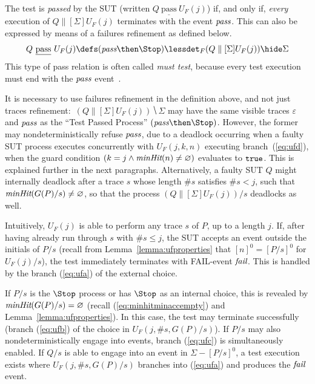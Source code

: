 \documentclass[3p,times]{elsarticle}
\newcommand{\ist}{\mbox{{\tt true}}}
\newcommand{\epass}{{\text{\it pass}}}
\newcommand{\efail}{{\text{\it fail}}}
\newcommand{\pass}{\underline{\text{pass}}}
\newcommand{\minhits}{\text{\it minHit}}
\begin{document}
The test is \emph{passed} by the SUT (written $Q\ \pass\ U_F(j)$) if, and
only if, {\it every} execution of $Q\parallel[\Sigma] U_F(j)$ terminates with
the event $\epass$. This can also be  expressed by means of a failures
refinement as defined below.
%
\begin{equation}
\label{eq:passF}
Q\ \pass\ U_F(j) \defs (\epass\then\Stop) \lessdet_F (Q\parallel[\Sigma] U_F(j)) \hide \Sigma
\end{equation}
%
This type of pass relation is often called \emph{must test}, because every
test execution must end with the $\epass$
event~\cite{Hennessy:1988:ATP:50497}.

It is necessary to use failures refinement in the definition above, and not
just traces refinement:~$(Q\parallel[\Sigma] U_F(j)) \hide \Sigma$ may have
the same visible traces $\varepsilon$ and $\epass$ as the ``Test Passed
Process'' $(\epass\then\Stop)$. However, the former may nondeterministically
refuse $\epass$, due to a deadlock occurring when a faulty SUT process
executes concurrently with $U_F(j,k,n)$ executing branch~(\ref{eq:ufd}), when
the guard condition $(k = j\wedge \minhits(n)\neq\varnothing)$ evaluates to
$\ist$. This is explained further in the next paragraphs. Alternatively, a
faulty SUT $Q$ might internally deadlock after a trace $s$ whose length $\#s$ 
satisfies  $\#s < j$, such that
  $\minhits(G(P)/s) \neq \varnothing$, so that the process
$(Q\parallel[\Sigma] U_F(j))/s$ deadlocks as well.

Intuitively, $U_F(j)$ is able to perform any trace $s$ of $P$, up to a length
$j$. If, after having already run through $s$ with $\#s \le j$, the SUT
accepts an event outside the initials of $P/s$
 (recall from Lemma~\ref{lemma:ufproperties} that $[n]^0 = [P/s]^0$ for $U_F(j)/s$),
the test immediately terminates with FAIL-event $\efail$. This is handled by
the branch (\ref{eq:ufa}) of the external choice. %

If $P/s$ is the $\Stop$ process or has $\Stop$ as an internal choice, this is
revealed by $\minhits(G(P)/s) = \varnothing$ (recall
(\ref{eq:minhitminaccempty}) and Lemma~\ref{lemma:ufproperties}). In this
case, the test may terminate successfully (branch (\ref{eq:ufb}) of the
choice in $U_F(j,\#s,G(P)/s)$). If $P/s$ may also nondeterministically engage
into events, branch (\ref{eq:ufc}) is simultaneously enabled. If $Q/s$ is
able to engage into an event in $\Sigma - [P/s]^0$, a test execution exists
where $U_F(j,\#s,G(P)/s)$ branches into (\ref{eq:ufa}) and produces the
$\efail$ event.
\end{document}
